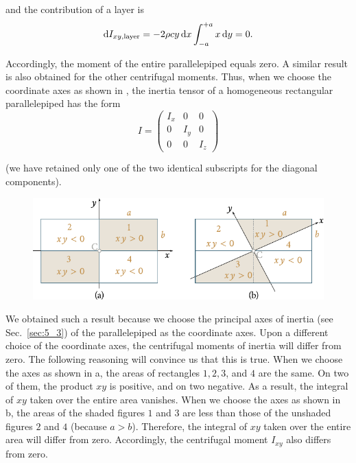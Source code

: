 \noindent
and the contribution of a layer is
\begin{equation*}
\mathrm{d} I_{xy,\text{layer}} = -2\rho cy\,\mathrm{d} x \int_{-a}^{+a}x\,\mathrm{d} y = 0.
\end{equation*}

\noindent
Accordingly, the moment of the entire parallelepiped equals zero. A similar result is also obtained for the other centrifugal moments. Thus, when we choose the coordinate axes as shown in , the inertia tensor of a homogeneous rectangular parallelepiped has the form
\begin{equation}\label{eq:5_43}
	I = \begin{pmatrix}
		I_x&0&0\\
		0&I_y&0\\
		0&0&I_z
	\end{pmatrix}
\end{equation}

\noindent
(we have retained only one of the two identical subscripts for the diagonal components).

\begin{figure}[t]
	\begin{center}
		\includegraphics[scale=0.9]{figures/ch_05/fig_5_18.pdf}
		\caption[]{}
		\label{fig:5_18}
	\end{center}
	\vspace{-0.9cm}
\end{figure}

We obtained such a result because we choose the principal axes of inertia (see Sec.~\ref{sec:5_3}) of the parallelepiped as the coordinate axes. Upon a different choice of the coordinate axes, the centrifugal moments of inertia will differ from zero. The following reasoning will convince us that this is true. When we choose the axes as shown in a, the areas of rectangles $1, 2, 3$, and $4$ are the same. On two of them, the product $xy$ is positive, and on two negative. As a result, the integral of $xy$ taken over the entire area vanishes. When we choose the axes as shown in b, the areas of the shaded figures $1$ and $3$ are less than those of the unshaded figures $2$ and $4$ (because $a>b$). Therefore, the integral of $xy$ taken over the entire area will differ from zero. Accordingly, the centrifugal moment $I_{xy}$ also differs from zero.

